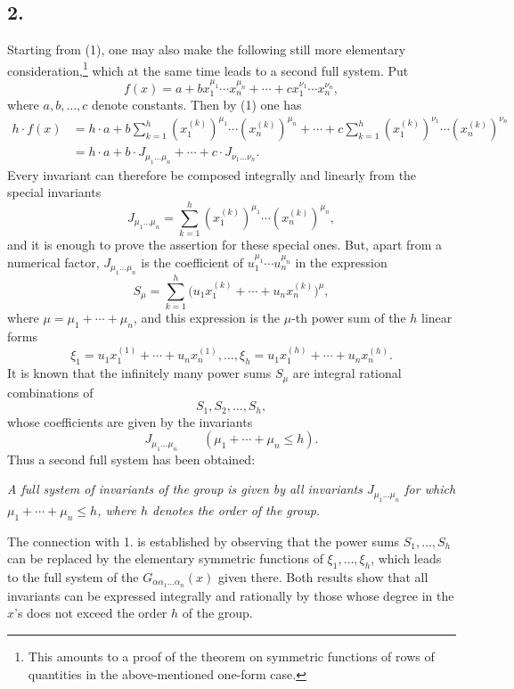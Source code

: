 \documentclass[11pt]{article}
\begin{document}
\subsection*{2.}
Starting from (1), one may also make the following still more elementary consideration,\footnote{This amounts to a proof of the theorem on symmetric functions of rows of quantities in the above-mentioned one-form case.} which at the same time leads to a second full system. Put
\[
  f(x)=a+b x_1^{\mu_1}\cdots x_n^{\mu_n}
       +\cdots+c x_1^{\nu_1}\cdots x_n^{\nu_n},
\]
where $a,b,\ldots,c$ denote constants. Then by (1) one has
\[
\begin{aligned}
 h\cdot f(x)
 &=h\cdot a+b\sum_{k=1}^{h}(x_1^{(k)})^{\mu_1}\cdots(x_n^{(k)})^{\mu_n}
     +\cdots
     +c\sum_{k=1}^{h}(x_1^{(k)})^{\nu_1}\cdots(x_n^{(k)})^{\nu_n} \\
 &=h\cdot a+b\cdot J_{\mu_1\ldots\mu_n}+\cdots+c\cdot J_{\nu_1\ldots\nu_n}.
\end{aligned}
\]
Every invariant can therefore be composed integrally and linearly from the special invariants
\[
  J_{\mu_1\ldots\mu_n}
  =\sum_{k=1}^{h}(x_1^{(k)})^{\mu_1}\cdots(x_n^{(k)})^{\mu_n},
\]
and it is enough to prove the assertion for these special ones. But, apart from a numerical factor, $J_{\mu_1\ldots\mu_n}$ is the coefficient of $u_1^{\mu_1}
\cdots u_n^{\mu_n}$ in the expression
\[
  S_\mu=\sum_{k=1}^{h}
  \bigl(u_1x_1^{(k)}+\cdots+u_nx_n^{(k)}\bigr)^{\mu},
\]
where $\mu=\mu_1+\cdots+\mu_n$, and this expression is the $\mu$-th power sum of the $h$ linear forms
\[
  \xi_1=u_1x_1^{(1)}+\cdots+u_nx_n^{(1)},\ldots,
  \xi_h=u_1x_1^{(h)}+\cdots+u_nx_n^{(h)}.
\]
It is known that the infinitely many power sums $S_\mu$ are integral rational combinations of
\[
  S_1,S_2,\ldots,S_h,
\]
whose coefficients are given by the invariants
\[
  J_{\mu_1\ldots\mu_n}\qquad(\mu_1+\cdots+\mu_n\le h).
\]
Thus a second full system has been obtained:

\emph{A full system of invariants of the group is given by all invariants $J_{\mu_1\ldots\mu_n}$ for which $\mu_1+\cdots+\mu_n\le h$, where $h$ denotes the order of the group.}

The connection with 1. is established by observing that the power sums $S_1,
\ldots,S_h$ can be replaced by the elementary symmetric functions of $\xi_1,
\ldots,
\xi_h$, which leads to the full system of the $G_{\alpha\alpha_1\ldots\alpha_n}(x)$ given there. Both results show that all invariants can be expressed integrally and rationally by those whose degree in the $x$'s does not exceed the order $h$ of the group.
\end{document}

